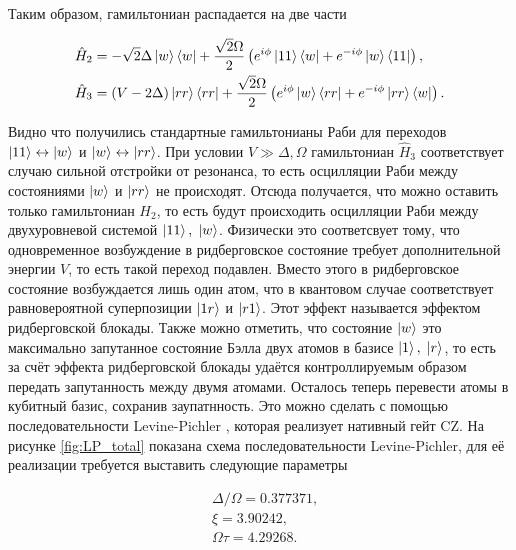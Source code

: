 Таким образом, гамильтониан распадается на две части

\begin{equation}
	\begin{aligned}
		& \hat{H}_{2} = -\sqrt{2}\Delta \left| w \right\rangle\left\langle w \right| + \frac{\sqrt{2}\Omega}{2}\left(e^{i\phi}\left| 11 \right\rangle\left\langle w \right| +e^{-i\phi}\left| w \right\rangle\left\langle 11 \right| \right), \\
		& \hat{H}_{3} = (V-2\Delta)\left| rr \right\rangle\left\langle rr \right| + \frac{\sqrt{2}\Omega}{2}\left(e^{i\phi}\left| w \right\rangle\left\langle rr \right| +e^{-i\phi}\left| rr \right\rangle\left\langle w \right| \right).
	\end{aligned}
\end{equation}

Видно что получились стандартные гамильтонианы Раби для переходов $\left| 11 \right\rangle \leftrightarrow \left| w \right\rangle$ и $\left| w \right\rangle \leftrightarrow \left| rr \right\rangle$. При условии $V \gg \Delta, \Omega$ гамильтониан $\hat{H}_3$ соответствует случаю сильной отстройки от резонанса, то есть осцилляции Раби между состояниями $\left| w \right\rangle$ и $\left| rr \right\rangle$ не происходят. Отсюда получается, что можно оставить только гамильтониан $H_2$, то есть будут происходить осцилляции Раби между двухуровневой системой $\left| 11 \right\rangle, \; \left| w \right\rangle$. Физически это соответсвует тому, что одновременное возбуждение в ридберговское состояние требует дополнительной энергии $V$, то есть такой переход подавлен. Вместо этого в ридберговское состояние возбуждается лишь один атом, что в квантовом случае соответствует равновероятной суперпозиции $\left| 1r \right\rangle$ и $\left| r1 \right\rangle$. Этот эффект называется эффектом ридберговской блокады. Также можно отметить, что состояние $\left| w \right\rangle$ это максимально запутанное состояние Бэлла двух атомов в базисе $\left| 1 \right\rangle, \; \left| r \right\rangle$, то есть за счёт эффекта ридберговской блокады удаётся контроллируемым образом передать запутанность между двумя атомами. Осталось теперь перевести атомы в кубитный базис, сохранив заупатнность. Это можно сделать с помощью последовательности Levine-Pichler \cite{toffoli}, которая реализует нативный гейт CZ. На рисунке \ref{fig:LP_total} показана схема последовательности Levine-Pichler, для её реализации требуется выставить следующие параметры \cite{toffoli}

\begin{equation}
	\begin{aligned}
		& \Delta/\Omega = 0.377371, \\
		& \xi = 3.90242, \\
		& \Omega \tau = 4.29268.
	\end{aligned}
\end{equation}

